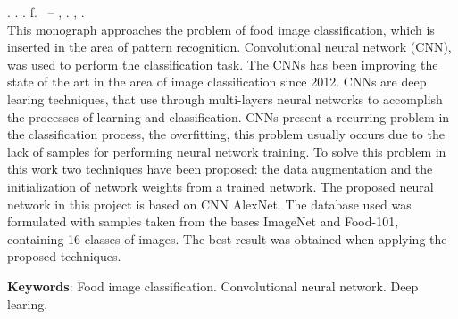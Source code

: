 
\begin{resumo}[ABSTRACT]
\begin{SingleSpacing}

\imprimirautorcitacao. \imprimirtitleabstract. \imprimirdata. \pageref {LastPage} f. \imprimirprojeto\ – \imprimirprograma, \imprimirinstituicao. \imprimirlocal, \imprimirdata.\\

This monograph approaches the problem of food image classification, which is inserted in the area of pattern recognition. Convolutional neural network (CNN), was used to perform the classification task. The CNNs has been improving the state of the art in the area of image classification since 2012. CNNs are deep learing techniques, that use through multi-layers neural networks to accomplish the processes of learning and classification. CNNs present a recurring problem in the classification process, the overfitting, this problem usually occurs due to the lack of samples for performing neural network training. To solve this problem in this work two techniques have been proposed: the data augmentation and the initialization of network weights from a trained network. The proposed neural network in this project is based on CNN AlexNet. The database used was formulated with samples taken from the bases ImageNet and Food-101, containing 16 classes of images. The best result was obtained when applying the proposed techniques.

\textbf{Keywords}: Food image classification. Convolutional neural network. Deep learing.

\end{SingleSpacing}
\end{resumo}


